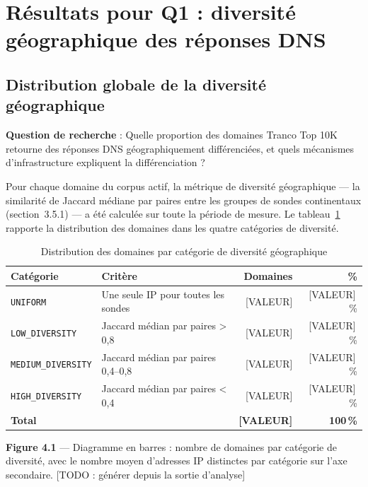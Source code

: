 \bigskip
\section{Résultats pour Q1 : diversité géographique des réponses DNS}
\label{sec:4.2}

\subsection{Distribution globale de la diversité géographique}
\label{subsec:4.2.1}

\textbf{Question de recherche} : Quelle proportion des domaines Tranco Top 10K retourne des réponses DNS géographiquement différenciées, et quels mécanismes d'infrastructure expliquent la différenciation ?

Pour chaque domaine du corpus actif, la métrique de diversité géographique --- la similarité de Jaccard médiane par paires entre les groupes de sondes continentaux (section~3.5.1) --- a été calculée sur toute la période de mesure. Le tableau~\ref{tab:diversity_categories} rapporte la distribution des domaines dans les quatre catégories de diversité.

\begin{table}[H]
\centering
\small
\begin{tabularx}{\linewidth}{l X r r}
\toprule
\textbf{Catégorie} & \textbf{Critère} & \textbf{Domaines} & \textbf{\%} \\
\midrule
\texttt{UNIFORM} & Une seule IP pour toutes les sondes & [VALEUR] & [VALEUR]\,\% \\
\texttt{LOW\_DIVERSITY} & Jaccard médian par paires > 0,8 & [VALEUR] & [VALEUR]\,\% \\
\texttt{MEDIUM\_DIVERSITY} & Jaccard médian par paires 0,4--0,8 & [VALEUR] & [VALEUR]\,\% \\
\texttt{HIGH\_DIVERSITY} & Jaccard médian par paires < 0,4 & [VALEUR] & [VALEUR]\,\% \\
\textbf{Total} & & \textbf{[VALEUR]} & \textbf{100\,\%} \\
\bottomrule
\end{tabularx}
\caption{Distribution des domaines par catégorie de diversité géographique}
\label{tab:diversity_categories}
\end{table}

\textbf{Figure 4.1} --- Diagramme en barres : nombre de domaines par catégorie de diversité, avec le nombre moyen d'adresses IP distinctes par catégorie sur l'axe secondaire. [TODO : générer depuis la sortie d'analyse]


